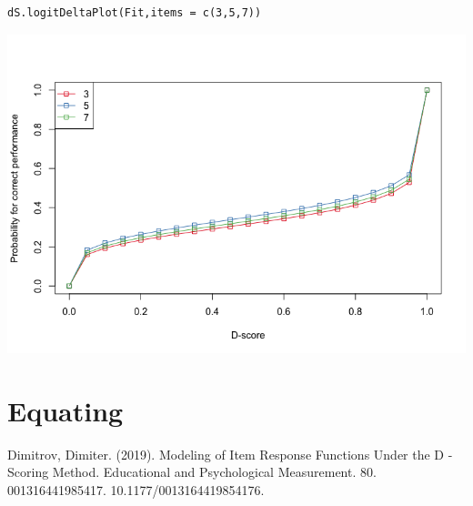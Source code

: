 \documentclass[10pt,a4paper]{article}
\begin{document}
\begin{lstlisting}
dS.logitDeltaPlot(Fit,items = c(3,5,7))
\end{lstlisting}

\includegraphics[scale=0.5]{icc.png}

\section{Equating}


\begin{thebibliography}{9}
 Dimitrov, Dimiter. (2019). Modeling of Item Response Functions Under the D -Scoring Method. Educational and Psychological Measurement. 80. 001316441985417. 10.1177/0013164419854176. 
\end{thebibliography}
\end{document}
